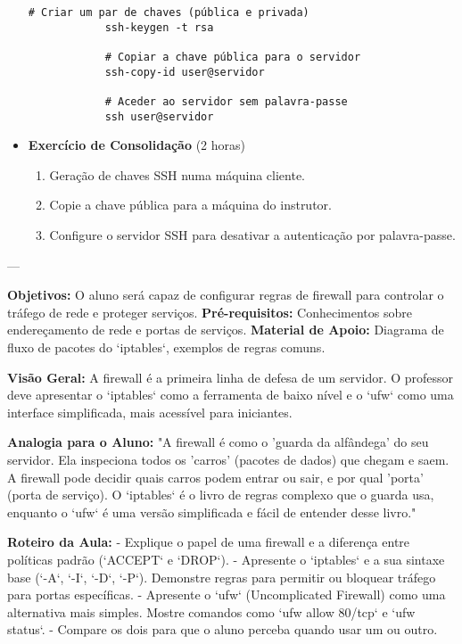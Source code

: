 \documentclass[10pt,a4paper]{article}
\newcommand{\guia}[1]{%
	\begin{tcolorbox}[
		colback=lightgray,
		colframe=darkblue,
		boxrule=1pt,
		arc=4mm,
		title=\textbf{Guia do Formador},
		fonttitle=\bfseries,
		coltitle=darkblue,
		boxsep=5pt,
		left=5mm, right=5mm, top=3mm, bottom=3mm
		]
		#1
	\end{tcolorbox}
}
\begin{document}
\begin{itemize}
		\begin{lstlisting}[caption=Geração e uso de Chaves SSH]
			# Criar um par de chaves (pública e privada)
			ssh-keygen -t rsa
			
			# Copiar a chave pública para o servidor
			ssh-copy-id user@servidor
			
			# Aceder ao servidor sem palavra-passe
			ssh user@servidor
		\end{lstlisting}
		
		\item \textbf{Exercício de Consolidação} (2 horas)
		\begin{enumerate}
			\item Geração de chaves SSH numa máquina cliente.
			\item Copie a chave pública para a máquina do instrutor.
			\item Configure o servidor SSH para desativar a autenticação por palavra-passe.
		\end{enumerate}
	\end{itemize}
	
	---
	
	\guia{
		\textbf{Objetivos:} O aluno será capaz de configurar regras de firewall para controlar o tráfego de rede e proteger serviços.
		\textbf{Pré-requisitos:} Conhecimentos sobre endereçamento de rede e portas de serviços.
		\textbf{Material de Apoio:} Diagrama de fluxo de pacotes do `iptables`, exemplos de regras comuns.
		
		\textbf{Visão Geral:} A firewall é a primeira linha de defesa de um servidor. O professor deve apresentar o `iptables` como a ferramenta de baixo nível e o `ufw` como uma interface simplificada, mais acessível para iniciantes.
		
		\textbf{Analogia para o Aluno:} "A firewall é como o 'guarda da alfândega' do seu servidor. Ela inspeciona todos os 'carros' (pacotes de dados) que chegam e saem. A firewall pode decidir quais carros podem entrar ou sair, e por qual 'porta' (porta de serviço). O `iptables` é o livro de regras complexo que o guarda usa, enquanto o `ufw` é uma versão simplificada e fácil de entender desse livro."
		
		\textbf{Roteiro da Aula:}
		- Explique o papel de uma firewall e a diferença entre políticas padrão (`ACCEPT` e `DROP`).
		- Apresente o `iptables` e a sua sintaxe base (`-A`, `-I`, `-D`, `-P`). Demonstre regras para permitir ou bloquear tráfego para portas específicas.
		- Apresente o `ufw` (Uncomplicated Firewall) como uma alternativa mais simples. Mostre comandos como `ufw allow 80/tcp` e `ufw status`.
		- Compare os dois para que o aluno perceba quando usar um ou outro.
	}
\end{document}
